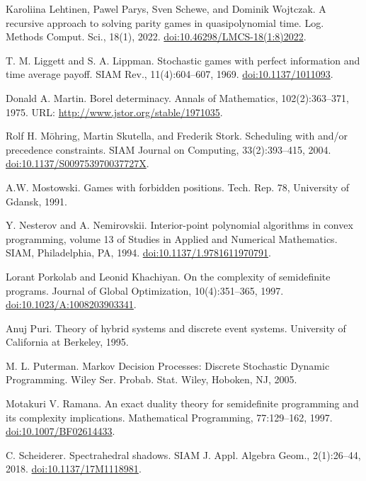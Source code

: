  Karoliina Lehtinen, Pawel Parys, Sven Schewe, and Dominik Wojtczak. A recursive approach to solving parity games in quasipolynomial time. Log. Methods Comput. Sci., 18(1), 2022. \href{https://doi.org/10.46298/LMCS-18(1:8)2022}{doi:10.46298/LMCS-18(1:8)2022}.

 T. M. Liggett and S. A. Lippman. Stochastic games with perfect information and time average payoff. SIAM Rev., 11(4):604–607, 1969. \href{https://doi.org/10.1137/1011093}{doi:10.1137/1011093}.

 Donald A. Martin. Borel determinacy. Annals of Mathematics, 102(2):363–371, 1975. URL: \href{http://www.jstor.org/stable/1971035}{http://www.jstor.org/stable/1971035}.

 Rolf H. Möhring, Martin Skutella, and Frederik Stork. Scheduling with and/or precedence constraints. SIAM Journal on Computing, 33(2):393–415, 2004. \href{https://doi.org/10.1137/S009753970037727X}{doi:10.1137/S009753970037727X}.

 A.W. Mostowski. Games with forbidden positions. Tech. Rep. 78, University of Gdansk, 1991.

 Y. Nesterov and A. Nemirovskii. Interior-point polynomial algorithms in convex programming, volume 13 of Studies in Applied and Numerical Mathematics. SIAM, Philadelphia, PA, 1994. \href{https://doi.org/10.1137/1.9781611970791}{doi:10.1137/1.9781611970791}.

 Lorant Porkolab and Leonid Khachiyan. On the complexity of semidefinite programs. Journal of Global Optimization, 10(4):351–365, 1997. \href{https://doi.org/10.1023/A:1008203903341}{doi:10.1023/A:1008203903341}.

 Anuj Puri. Theory of hybrid systems and discrete event systems. University of California at Berkeley, 1995.

 M. L. Puterman. Markov Decision Processes: Discrete Stochastic Dynamic Programming. Wiley Ser. Probab. Stat. Wiley, Hoboken, NJ, 2005.

 Motakuri V. Ramana. An exact duality theory for semidefinite programming and its complexity implications. Mathematical Programming, 77:129–162, 1997. \href{https://doi.org/10.1007/BF02614433}{doi:10.1007/BF02614433}.

 C. Scheiderer. Spectrahedral shadows. SIAM J. Appl. Algebra Geom., 2(1):26–44, 2018. \href{https://doi.org/10.1137/17M1118981}{doi:10.1137/17M1118981}.

